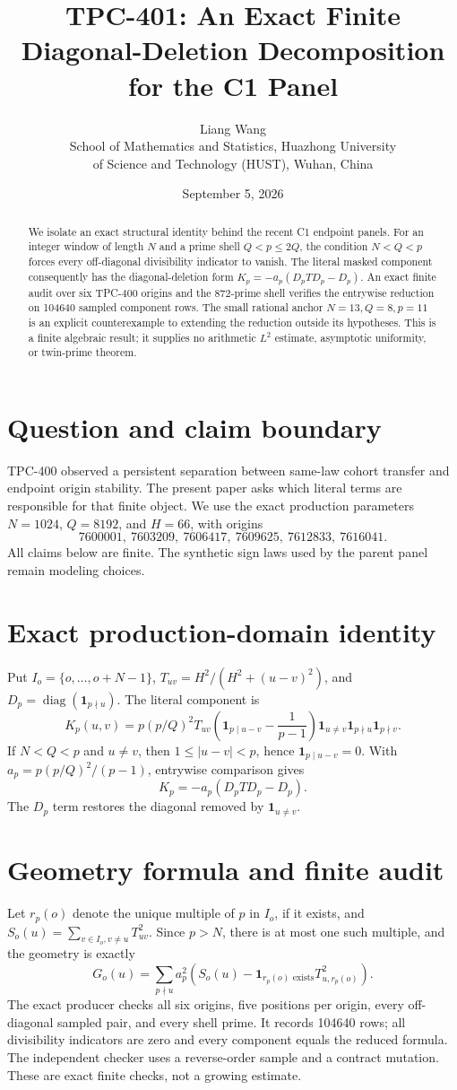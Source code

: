 \documentclass[11pt]{article}
\title{TPC-401: An Exact Finite Diagonal-Deletion Decomposition for the C1 Panel}
\author{Liang Wang\\School of Mathematics and Statistics, Huazhong University\\of Science and Technology (HUST), Wuhan, China}
\date{September 5, 2026}
\begin{document}
\maketitle
\begin{abstract}
We isolate an exact structural identity behind the recent C1 endpoint panels.
For an integer window of length $N$ and a prime shell $Q<p\leq 2Q$, the
condition $N<Q<p$ forces every off-diagonal divisibility indicator to vanish.
The literal masked component consequently has the diagonal-deletion form
$K_p=-a_p(D_pTD_p-D_p)$.  An exact finite audit over six TPC-400 origins and
the 872-prime shell verifies the entrywise reduction on 104640 sampled
component rows.  The small rational anchor $N=13,Q=8,p=11$ is an explicit
counterexample to extending the reduction outside its hypotheses.  This is a
finite algebraic result; it supplies no arithmetic $L^2$ estimate, asymptotic
uniformity, or twin-prime theorem.
\end{abstract}

\section{Question and claim boundary}
TPC-400 observed a persistent separation between same-law cohort transfer and
endpoint origin stability.  The present paper asks which literal terms are
responsible for that finite object.  We use the exact production parameters
$N=1024$, $Q=8192$, and $H=66$, with origins
\[
7600001,\ 7603209,\ 7606417,\ 7609625,\ 7612833,\ 7616041.
\]
All claims below are finite.  The synthetic sign laws used by the parent panel
remain modeling choices.

\section{Exact production-domain identity}
Put $I_o=\{o,\ldots,o+N-1\}$,
$T_{uv}=H^2/(H^2+(u-v)^2)$, and
$D_p=\operatorname{diag}(\mathbf 1_{p\nmid u})$.  The literal component is
\[
K_p(u,v)=p(p/Q)^2T_{uv}\left(\mathbf 1_{p\mid u-v}-\frac1{p-1}\right)
\mathbf 1_{u\ne v}\mathbf 1_{p\nmid u}\mathbf 1_{p\nmid v}.
\]
If $N<Q<p$ and $u\ne v$, then $1\leq|u-v|<p$, hence
$\mathbf 1_{p\mid u-v}=0$.  With
$a_p=p(p/Q)^2/(p-1)$, entrywise comparison gives
\[
\boxed{K_p=-a_p(D_pTD_p-D_p).}
\]
The $D_p$ term restores the diagonal removed by $\mathbf 1_{u\ne v}$.

\section{Geometry formula and finite audit}
Let $r_p(o)$ denote the unique multiple of $p$ in $I_o$, if it exists, and
$S_o(u)=\sum_{v\in I_o,v\ne u}T_{uv}^2$.  Since $p>N$, there is at most one
such multiple, and the geometry is exactly
\[
G_o(u)=\sum_{p\nmid u}a_p^2\left(S_o(u)-
\mathbf 1_{r_p(o)\text{ exists}}T_{u,r_p(o)}^2\right).
\]
The exact producer checks all six origins, five positions per origin, every
off-diagonal sampled pair, and every shell prime.  It records 104640 rows;
all divisibility indicators are zero and every component equals the reduced
formula.  The independent checker uses a reverse-order sample and a contract
mutation.  These are exact finite checks, not a growing estimate.
\end{document}
